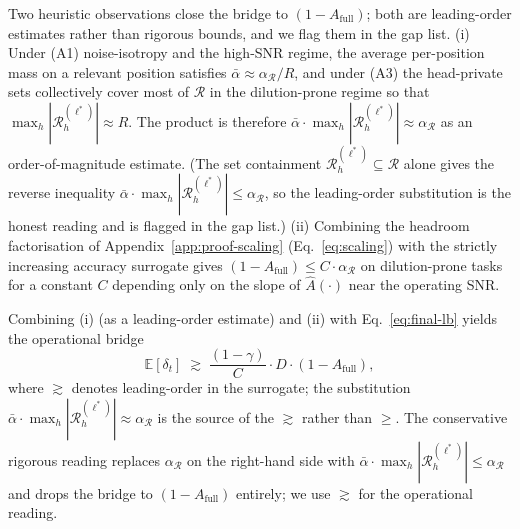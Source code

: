 \documentclass{article} %
\begin{document}
Two heuristic observations close the bridge to $(1 - A_{\mathrm{full}})$;
both are leading-order estimates rather than rigorous bounds, and we
flag them in the gap list.
(i) Under (A1) noise-isotropy and the high-SNR regime, the average
per-position mass on a relevant position satisfies $\bar\alpha \approx
\alpha_{\mathcal{R}} / R$, and under (A3) the head-private sets
collectively cover most of $\mathcal{R}$ in the dilution-prone regime so
that $\max_h |\mathcal{R}^{(\ell^*)}_h| \approx R$. The product is
therefore $\bar\alpha \cdot \max_h |\mathcal{R}^{(\ell^*)}_h| \approx
\alpha_{\mathcal{R}}$ as an order-of-magnitude estimate. (The set
containment $\mathcal{R}^{(\ell^*)}_h \subseteq \mathcal{R}$ alone gives
the reverse inequality $\bar\alpha \cdot \max_h |\mathcal{R}^{(\ell^*)}_h|
\leq \alpha_{\mathcal{R}}$, so the leading-order substitution is the
honest reading and is flagged in the gap list.)
(ii) Combining the headroom factorisation of
Appendix~\ref{app:proof-scaling} (Eq.~\eqref{eq:scaling}) with the
strictly increasing accuracy surrogate gives $(1 - A_{\mathrm{full}})
\leq C \cdot \alpha_{\mathcal{R}}$ on dilution-prone tasks for a
constant $C$ depending only on the slope of $\hat A(\cdot)$ near the
operating SNR.

Combining (i) (as a leading-order estimate) and (ii) with
Eq.~\eqref{eq:final-lb} yields the operational bridge
\begin{equation}
\label{eq:bridge-final}
\mathbb{E}[\delta_t]
\;\gtrsim\;
\frac{(1 - \gamma)}{C} \cdot D \cdot (1 - A_{\mathrm{full}}),
\end{equation}
where $\gtrsim$ denotes leading-order in the surrogate; the substitution
$\bar\alpha \cdot \max_h |\mathcal{R}^{(\ell^*)}_h| \approx
\alpha_{\mathcal{R}}$ is the source of the $\gtrsim$ rather than $\geq$.
The conservative rigorous reading replaces $\alpha_{\mathcal{R}}$ on the
right-hand side with $\bar\alpha \cdot \max_h |\mathcal{R}^{(\ell^*)}_h|
\leq \alpha_{\mathcal{R}}$ and drops the bridge to $(1 - A_{\mathrm{full}})$
entirely; we use $\gtrsim$ for the operational reading.
\end{document}
